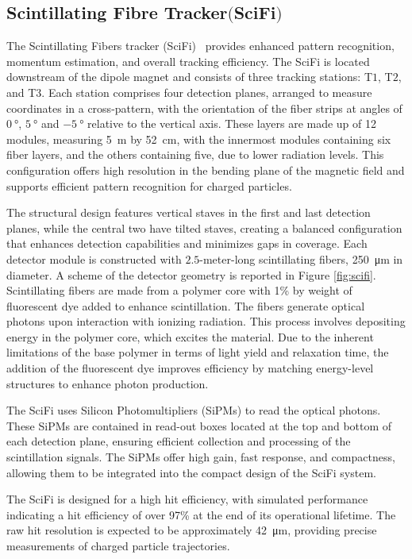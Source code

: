 \subsection[Scintillating Fibre Tracker]{Scintillating Fibre Tracker$ \bigl($SciFi$\bigr)$}
The Scintillating Fibers tracker (SciFi)~\cite{scifi} provides enhanced pattern recognition, momentum estimation, and overall tracking efficiency.
The SciFi is located downstream of the dipole magnet and consists of three tracking stations: T$1$, T$2$, and T$3$. Each station comprises four detection planes, arranged to measure coordinates in a cross-pattern, with the orientation of the fiber strips at angles of $\SI{0}{\degree}$, $\SI{+5}{\degree}$ and $\SI{-5}{\degree}$ relative to the vertical axis. These layers are made up of 12 modules, measuring \SI{5}{\meter} by \SI{52}{\centi\meter}, with the innermost modules containing six fiber layers, and the others containing five, due to lower radiation levels. This configuration offers high resolution in the bending plane of the magnetic field and supports efficient pattern recognition for charged particles.

The structural design features vertical staves in the first and last detection planes, while the central two have tilted staves, creating a balanced configuration that enhances detection capabilities and minimizes gaps in coverage. Each detector module is constructed with $2.5$-meter-long scintillating fibers, \SI{250}{\micro\meter} in diameter. 
A scheme of the detector geometry is reported in Figure \ref{fig:scifi}.
Scintillating fibers are made from a polymer core with 1\% by weight of fluorescent dye added to enhance scintillation. The fibers generate optical photons upon interaction with ionizing radiation. This process involves depositing energy in the polymer core, which excites the material. Due to the inherent limitations of the base polymer in terms of light yield and relaxation time, the addition of the fluorescent dye improves efficiency by matching energy-level structures to enhance photon production.

The SciFi uses Silicon Photomultipliers (SiPMs) to read the optical photons. These SiPMs are contained in read-out boxes located at the top and bottom of each detection plane, ensuring efficient collection and processing of the scintillation signals. The SiPMs offer high gain, fast response, and compactness, allowing them to be integrated into the compact design of the SciFi system.

The SciFi is designed for a high hit efficiency, with simulated performance indicating a hit efficiency of over 97\% at the end of its operational lifetime. The raw hit resolution is expected to be approximately \SI{42}{\micro\meter}, providing precise measurements of charged particle trajectories.

